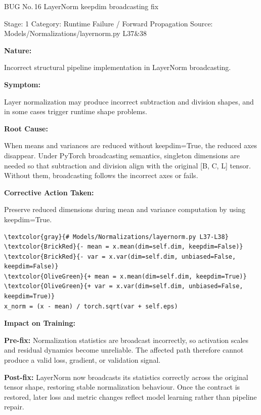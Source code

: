 \documentclass[10pt]{article}
\newcommand{\FieldLabel}[1]{%
 {\bfseries #1:}\par
}
\begin{document}
\begin{bugbox}{BUG No.\,16 \quad LayerNorm keepdim broadcasting fix}
{\color{MetaGray}\small Stage: 1 \;\textbar\; Category: Runtime Failure / Forward Propagation \;\textbar\; Source: Models/Normalizations/layernorm.py L37\&38\par}
\vspace{0.22em}
\FieldLabel{Nature}
Incorrect structural pipeline implementation in LayerNorm broadcasting.
\par
\vspace{0.35em}
\FieldLabel{Symptom}
Layer normalization may produce incorrect subtraction and division shapes, and in some cases trigger runtime shape problems.
\par
\vspace{0.35em}
\FieldLabel{Root Cause}
When means and variances are reduced without keepdim=True, the reduced axes disappear. Under PyTorch broadcasting semantics, singleton dimensions are needed so that subtraction and division align with the original {[}B, C, L{]} tensor. Without them, broadcasting follows the incorrect axes or fails.
\par
\vspace{0.35em}
\FieldLabel{Corrective Action Taken}
Preserve reduced dimensions during mean and variance computation by using keepdim=True.
\par
\vspace{0.35em}
\begin{Verbatim}[commandchars=\\\{\},fontsize=\footnotesize,breaklines=true,breaksymbol={},frame=leftline,framerule=2pt,rulecolor=\color{gray!40},xleftmargin=6pt,formatcom=\singlespacing]
\textcolor{gray}{# Models/Normalizations/layernorm.py L37-L38}
\textcolor{BrickRed}{- mean = x.mean(dim=self.dim, keepdim=False)}
\textcolor{BrickRed}{- var = x.var(dim=self.dim, unbiased=False, keepdim=False)}
\textcolor{OliveGreen}{+ mean = x.mean(dim=self.dim, keepdim=True)}
\textcolor{OliveGreen}{+ var = x.var(dim=self.dim, unbiased=False, keepdim=True)}
x_norm = (x - mean) / torch.sqrt(var + self.eps)
\end{Verbatim}
\vspace{0.22em}
\FieldLabel{Impact on Training}
\textbf{Pre-fix:} Normalization statistics are broadcast incorrectly, so activation scales and residual dynamics become unreliable. The affected path therefore cannot produce a valid loss, gradient, or validation signal.\par\smallskip
\textbf{Post-fix:} LayerNorm now broadcasts its statistics correctly across the original tensor shape, restoring stable normalization behaviour. Once the contract is restored, later loss and metric changes reflect model learning rather than pipeline repair.
\par
\vspace{0.35em}
\end{bugbox}
\end{document}
